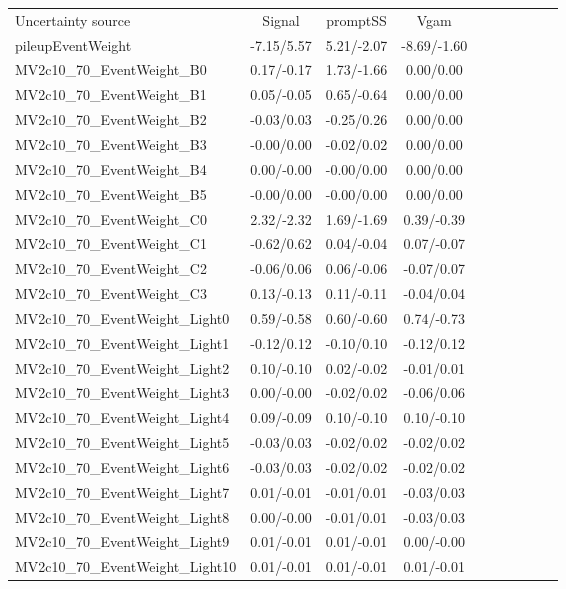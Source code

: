 \begin{table}[h]
\scriptsize
\begin{center}
\begin{tabular}{l|ccccccccc}
\hline
\hline
Uncertainty source &Signal &promptSS &Vgam \\
pileupEventWeight &-7.15/5.57 &5.21/-2.07 &-8.69/-1.60 \\
MV2c10\_70\_EventWeight\_B0 &0.17/-0.17 &1.73/-1.66 &0.00/0.00 \\
MV2c10\_70\_EventWeight\_B1 &0.05/-0.05 &0.65/-0.64 &0.00/0.00 \\
MV2c10\_70\_EventWeight\_B2 &-0.03/0.03 &-0.25/0.26 &0.00/0.00 \\
MV2c10\_70\_EventWeight\_B3 &-0.00/0.00 &-0.02/0.02 &0.00/0.00 \\
MV2c10\_70\_EventWeight\_B4 &0.00/-0.00 &-0.00/0.00 &0.00/0.00 \\
MV2c10\_70\_EventWeight\_B5 &-0.00/0.00 &-0.00/0.00 &0.00/0.00 \\
MV2c10\_70\_EventWeight\_C0 &2.32/-2.32 &1.69/-1.69 &0.39/-0.39 \\
MV2c10\_70\_EventWeight\_C1 &-0.62/0.62 &0.04/-0.04 &0.07/-0.07 \\
MV2c10\_70\_EventWeight\_C2 &-0.06/0.06 &0.06/-0.06 &-0.07/0.07 \\
MV2c10\_70\_EventWeight\_C3 &0.13/-0.13 &0.11/-0.11 &-0.04/0.04 \\
MV2c10\_70\_EventWeight\_Light0 &0.59/-0.58 &0.60/-0.60 &0.74/-0.73 \\
MV2c10\_70\_EventWeight\_Light1 &-0.12/0.12 &-0.10/0.10 &-0.12/0.12 \\
MV2c10\_70\_EventWeight\_Light2 &0.10/-0.10 &0.02/-0.02 &-0.01/0.01 \\
MV2c10\_70\_EventWeight\_Light3 &0.00/-0.00 &-0.02/0.02 &-0.06/0.06 \\
MV2c10\_70\_EventWeight\_Light4 &0.09/-0.09 &0.10/-0.10 &0.10/-0.10 \\
MV2c10\_70\_EventWeight\_Light5 &-0.03/0.03 &-0.02/0.02 &-0.02/0.02 \\
MV2c10\_70\_EventWeight\_Light6 &-0.03/0.03 &-0.02/0.02 &-0.02/0.02 \\
MV2c10\_70\_EventWeight\_Light7 &0.01/-0.01 &-0.01/0.01 &-0.03/0.03 \\
MV2c10\_70\_EventWeight\_Light8 &0.00/-0.00 &-0.01/0.01 &-0.03/0.03 \\
MV2c10\_70\_EventWeight\_Light9 &0.01/-0.01 &0.01/-0.01 &0.00/-0.00 \\
MV2c10\_70\_EventWeight\_Light10 &0.01/-0.01 &0.01/-0.01 &0.01/-0.01 \\

\end{tabular}
\end{center}
\end{table}
